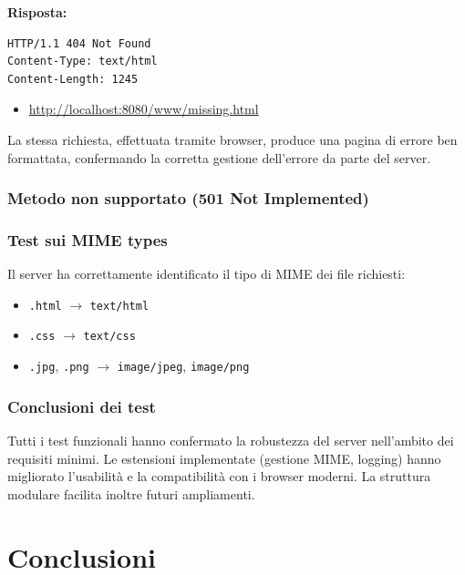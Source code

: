 \documentclass[a4paper,12pt]{report}
\begin{document}
\textbf{Risposta:}
\begin{verbatim}
HTTP/1.1 404 Not Found
Content-Type: text/html
Content-Length: 1245
\end{verbatim}

\begin{itemize}
    \item \url{http://localhost:8080/www/missing.html}
\end{itemize}
La stessa richiesta, effettuata tramite browser, produce una pagina di errore ben formattata, confermando la corretta gestione dell'errore da parte del server.

\subsection{Metodo non supportato (501 Not Implemented)}
\subsection{Test sui MIME types}
Il server ha correttamente identificato il tipo di MIME dei file richiesti:
\begin{itemize}
    \item \texttt{.html} $\rightarrow$ \texttt{text/html}
    \item \texttt{.css} $\rightarrow$ \texttt{text/css}
    \item \texttt{.jpg}, \texttt{.png} $\rightarrow$ \texttt{image/jpeg}, \texttt{image/png}
\end{itemize}

\subsection{Conclusioni dei test}
Tutti i test funzionali hanno confermato la robustezza del server nell'ambito dei requisiti minimi. Le estensioni implementate (gestione MIME, logging)
hanno migliorato l'usabilità e la compatibilità con i browser moderni. La struttura modulare facilita inoltre futuri ampliamenti.


\chapter{Conclusioni}
\end{document}
